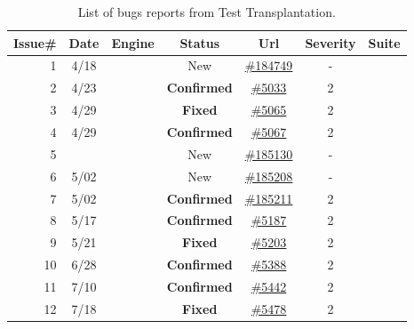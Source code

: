 \begin{table}[t!]
  \renewcommand{\arraystretch}{0.95}
      \centering
      \caption{List of bugs reports from Test Transplantation.}
      \label{tab:test-transplantation-bugs}
    
      \begin{tabular}{rcccccc}
        \toprule Issue\# & Date & Engine  & Status & Url & Severity & Suite \\
        \midrule
       1  & 4/18  & \jsc{}  & New  & \href{https://bugs.webkit.org/show\_bug.cgi?id=184749}{\#184749} & - & \jerry{} \\
       2  & 4/23 & \chakra{}  & \textbf{Confirmed}  & \href{\repoCH/issues/5033}{\#5033} & 2 & \smonkey{} \\   
       3  & 4/29 & \chakra{}  & \textbf{Fixed}   & \href{\repoCH/issues/5065}{\#5065} & 2 & \smonkey{} \\
       4  & \multirow{2}{*}{4/29} & \chakra{} & \textbf{Confirmed} & \href{\repoCH/issues/5067}{\#5067} & 2 & \smonkey{} \\
       5  &  & \jsc{} & New & \href{https://bugs.webkit.org/show\_bug.cgi?id=185130}{\#185130} &  -  & \smonkey{}\\
       6 & 5/02  & \jsc{} & New  & \href{https://bugs.webkit.org/show\_bug.cgi?id=185208}{\#185208} & - & \smonkey{} \\
       7 & 5/02  & \jsc{} & \textbf{Confirmed}  & \href{https://bugs.webkit.org/show_bug.cgi?id=185211}{\#185211} & 2 & \smonkey{}\\ %
       8 & 5/17  & \chakra{} & \textbf{Confirmed} & \href{\repoCH/issues/5187}{\#5187} & 2 & \jsc{}\\
       9 & 5/21  & \chakra{} & \textbf{Fixed} & \href{\repoCH/issues/5203}{\#5203} & 2 & \smonkey{}\\
       10 & 6/28  & \chakra{} & \textbf{Confirmed}  & \href{\repoCH/issues/5388}{\#5388} & 2 & \jsc{}\\
       11 & 7/10  & \chakra{} & \textbf{Confirmed} & \href{\repoCH/issues/5442}{\#5442} & 2 & \jerry{}\\ %
       12 & 7/18  & \chakra{} & \textbf{Fixed} & \href{\repoCH/issues/5478}{\#5478} & 2 & \smonkey{}\\

\end{tabular}
\end{table}
